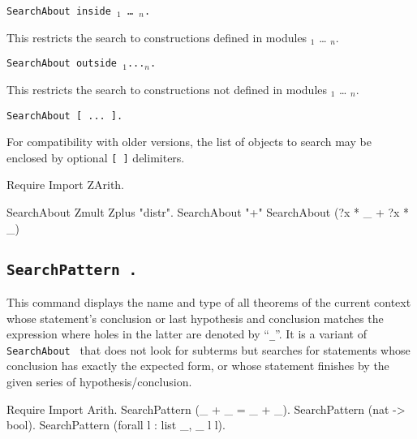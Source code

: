 \begin{Variants}
\item
  {\tt SearchAbout \nelist{{\termpatternorstr}}{}
    inside {\module$_1$} \ldots{} {\module$_n$}.}

This restricts the search to constructions defined in modules
{\module$_1$} \ldots{} {\module$_n$}.

\item
  {\tt SearchAbout \nelist{{\termpatternorstr}}{}
     outside {\module$_1$}...{\module$_n$}.}

This restricts the search to constructions not defined in modules
{\module$_1$} \ldots{} {\module$_n$}.

\item {\tt SearchAbout [ ... ]. }

For compatibility with older versions, the list of objects to search
may be enclosed by optional {\tt [  ]} delimiters.

\end{Variants}

\examples

\begin{coq_example*}
Require Import ZArith.
\end{coq_example*}
\begin{coq_example}
SearchAbout Zmult Zplus "distr".
SearchAbout "+"%
SearchAbout (?x * _ + ?x * _)%
\end{coq_example}

\subsection[\tt SearchPattern {\termpattern}.]{\tt SearchPattern {\term}.}

This command displays the name and type of all theorems of the current
context whose statement's conclusion or last hypothesis and conclusion
matches the expression {\term} where holes in the latter are denoted
by ``{\texttt \_}''. It is a variant of {\tt SearchAbout
  {\termpattern}} that does not look for subterms but searches for
statements whose conclusion has exactly the expected form, or whose
statement finishes by the given series of hypothesis/conclusion.

\begin{coq_example}
Require Import Arith.
SearchPattern (_ + _ = _ + _).
SearchPattern (nat -> bool).
SearchPattern (forall l : list _, _ l l).
\end{coq_example}

